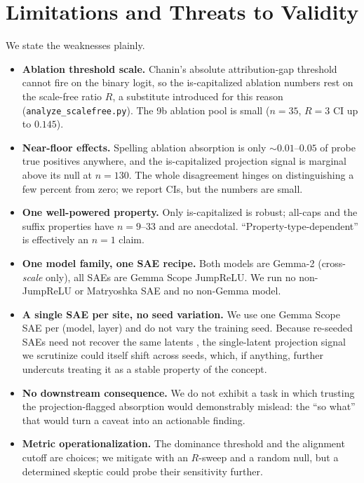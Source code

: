 \documentclass[11pt]{article}
\newcommand{\iscap}{\textsf{is-capitalized}}
\newcommand{\allcaps}{\textsf{all-caps}}
\newcommand{\code}[1]{\texttt{#1}}
\theoremstyle{definition}
\begin{document}
\section{Limitations and Threats to Validity}\label{sec:limits}
We state the weaknesses plainly.
\begin{itemize}[leftmargin=1.4em,itemsep=2pt]
  \item \textbf{Ablation threshold scale.} Chanin's absolute attribution-gap threshold cannot fire on the
  binary logit, so the \iscap{} ablation numbers rest on the scale-free ratio $R$, a substitute introduced for
  this reason (\code{analyze\_scalefree.py}). The 9b ablation pool is small ($n{=}35$, $R{=}3$ CI up to $0.145$).
  \item \textbf{Near-floor effects.} Spelling ablation absorption is only ${\sim}0.01$--$0.05$ of probe true positives anywhere, and
  the \iscap{} projection signal is marginal above its null at $n{=}130$. The whole disagreement hinges on
  distinguishing a few percent from zero; we report CIs, but the numbers are small.
  \item \textbf{One well-powered property.} Only \iscap{} is robust; \allcaps{} and the suffix properties
  have $n{=}9$--$33$ and are anecdotal. ``Property-type-dependent'' is effectively an $n{=}1$ claim.
  \item \textbf{One model family, one SAE recipe.} Both models are Gemma-2 (cross-\emph{scale} only), all
  SAEs are Gemma Scope JumpReLU. We run no non-JumpReLU or Matryoshka SAE and no non-Gemma model.
  \item \textbf{A single SAE per site, no seed variation.} We use one Gemma Scope SAE per (model, layer) and
  do not vary the training seed. Because re-seeded SAEs need not recover the same latents
  \citep{leask2025canonical}, the single-latent projection signal we scrutinize could itself shift across
  seeds, which, if anything, further undercuts treating it as a stable property of the concept.
  \item \textbf{No downstream consequence.} We do not exhibit a task in which trusting the projection-flagged
  absorption would demonstrably mislead: the ``so what'' that would turn a caveat into an actionable finding.
  \item \textbf{Metric operationalization.} The dominance threshold and the alignment cutoff are choices; we
  mitigate with an $R$-sweep and a random null, but a determined skeptic could probe their sensitivity further.
\end{itemize}
\end{document}
